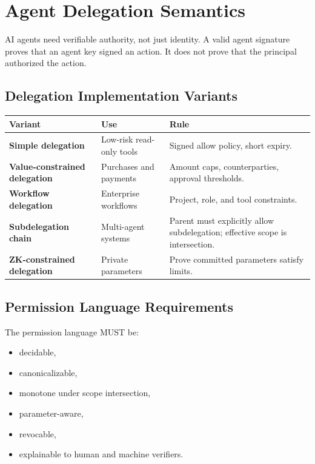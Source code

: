 \documentclass[11pt]{article}
\begin{document}
\section{Agent Delegation Semantics}

AI agents need verifiable authority, not just identity. A valid agent signature proves that an agent key signed an action. It does not prove that the principal authorized the action.

\subsection{Delegation Implementation Variants}

\begin{center}
\begin{tabularx}{\textwidth}{>{\bfseries}p{} p{} X}
\toprule
Variant & Use & Rule \\
\midrule
Simple delegation & Low-risk read-only tools & Signed allow policy, short expiry. \\
Value-constrained delegation & Purchases and payments & Amount caps, counterparties, approval thresholds. \\
Workflow delegation & Enterprise workflows & Project, role, and tool constraints. \\
Subdelegation chain & Multi-agent systems & Parent must explicitly allow subdelegation; effective scope is intersection. \\
ZK-constrained delegation & Private parameters & Prove committed parameters satisfy limits. \\
\bottomrule
\end{tabularx}
\end{center}

\subsection{Permission Language Requirements}

The permission language MUST be:

\begin{itemize}
    \item decidable,
    \item canonicalizable,
    \item monotone under scope intersection,
    \item parameter-aware,
    \item revocable,
    \item explainable to human and machine verifiers.
\end{itemize}
\end{document}
